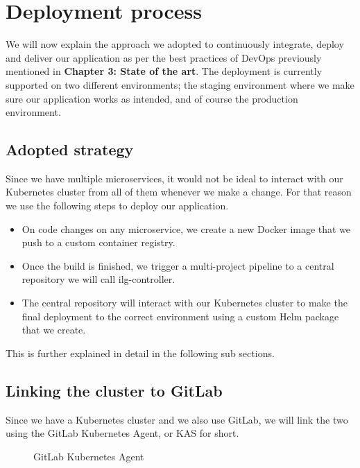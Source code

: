 \section{Deployment process}
We will now explain the approach we adopted to continuously integrate, deploy and deliver our application as per the best practices of DevOps previously mentioned in \textbf{Chapter 3: State of the art}.
The deployment is currently supported on two different environments; the staging environment where we make sure our application works as intended, and of course the production environment.

\subsection{Adopted strategy}
Since we have multiple microservices, it would not be ideal to interact with our Kubernetes cluster from all of them whenever we make a change.
For that reason we use the following steps to deploy our application.
\begin{itemize}
    \item On code changes on any microservice, we create a new Docker image that we push to a custom container registry.
    \item Once the build is finished, we trigger a multi-project pipeline to a central repository we will call ilg-controller.
    \item The central repository will interact with our Kubernetes cluster to make the final deployment to the correct environment using a custom Helm package that we create.
\end{itemize}

This is further explained in detail in the following sub sections.

\subsection{Linking the cluster to GitLab}
Since we have a Kubernetes cluster and we also use GitLab, we will link the two using the GitLab Kubernetes Agent, or KAS for short.

\begin{figure}[H]
    \centering
    \caption{GitLab Kubernetes Agent}
    \label{fig:gitlab-kubernetes-agent}
\end{figure}

